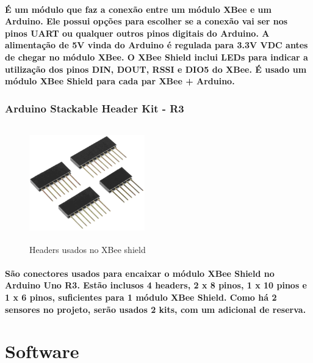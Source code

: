 \paragraph{
É um módulo que faz a conexão entre um módulo XBee e um Arduino. Ele possui opções para escolher se a conexão vai ser nos pinos UART ou qualquer outros pinos digitais do Arduino. A alimentação de 5V vinda do Arduino é regulada para 3.3V VDC antes de chegar no módulo XBee. O XBee Shield inclui LEDs para indicar a utilização dos pinos DIN, DOUT, RSSI e DIO5 do XBee. É usado um módulo XBee Shield para cada par XBee + Arduino.
}

\subsubsection{Arduino Stackable Header Kit - R3}
\begin{figure}[H]
\begin{center}
\includegraphics[width=5cm,height=5cm,keepaspectratio]{figuras/headers.png}
\caption{\label{fig:xbee shield headers} Headers usados no XBee shield}
\end{center}
\end{figure}
\paragraph{
São conectores usados para encaixar o módulo XBee Shield no Arduino Uno R3. Estão inclusos 4 headers, 2 x 8 pinos, 1 x 10 pinos e 1 x 6 pinos, suficientes para 1 módulo XBee Shield. Como há 2 sensores no projeto, serão usados 2 kits, com um adicional de reserva.
}

\section{Software}
\label{Sec:software}
